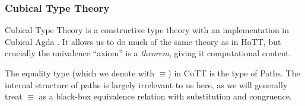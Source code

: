 \subsubsection{Cubical Type Theory}
Cubical Type Theory \cite{cohenCubicalTypeTheory2016} is a constructive type
theory with an implementation in Cubical Agda
\cite{vezzosiCubicalAgdaDependently2019}.
It allows us to do much of the same theory as in HoTT, but crucially the
univalence ``axiom'' is a \emph{theorem}, giving it computational content.
\begin{definition} \label{path-types}
  The equality type (which we denote with \(\equiv\)) in CuTT is the type of
  Paths\footnotemark.
  The internal structure of paths is largely irrelevant to us here, as we will
  generally treat \(\equiv\) as a black-box equivalence relation with
  substitution and congruence.
\end{definition}

